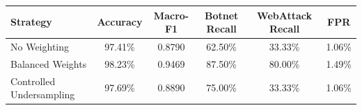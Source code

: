 \begin{tabular}{lccccc}
\hline
Strategy & Accuracy & Macro-F1 & Botnet Recall & WebAttack Recall & FPR \\
\hline
No Weighting & 97.41\% & 0.8790 & 62.50\% & 33.33\% & 1.06\% \\
Balanced Weights & 98.23\% & 0.9469 & 87.50\% & 80.00\% & 1.49\% \\
Controlled Undersampling & 97.69\% & 0.8890 & 75.00\% & 33.33\% & 1.06\% \\
\hline
\end{tabular}
